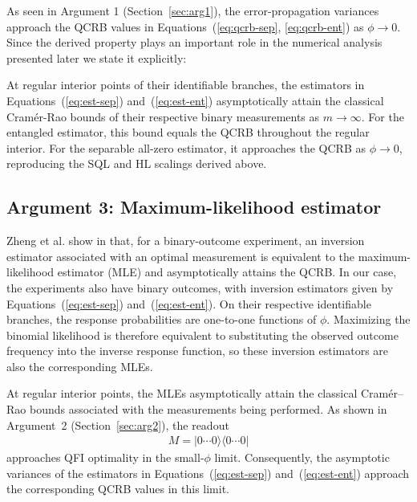 As seen in Argument 1 (Section~\ref{sec:arg1}), the error-propagation variances approach
the QCRB values in Equations~(\ref{eq:qcrb-sep}, \ref{eq:qcrb-ent}) as $\phi\to0$.
Since the derived property plays an important role in the numerical analysis presented 
later we state it explicitly:
\begin{fact}
At regular interior points of their identifiable branches, the estimators in Equations~(\ref{eq:est-sep}) and~(\ref{eq:est-ent}) 
asymptotically attain the classical Cramér-Rao bounds of their respective binary measurements as $m\to\infty$. 
For the entangled estimator, this bound equals the QCRB throughout the regular interior. 
For the separable all-zero estimator, it approaches the QCRB as $\phi\to0$, reproducing the SQL and HL scalings derived above.
\end{fact}

\subsection{Argument 3: Maximum-likelihood estimator}
Zheng et al. show in \cite{zhengQuantumPhaseEstimation2022} that, for a binary-outcome experiment, an inversion estimator associated with an optimal measurement is equivalent to the maximum-likelihood estimator (MLE) and asymptotically attains the QCRB. In our case, the experiments also have binary outcomes, with inversion estimators given by Equations~(\ref{eq:est-sep}) and~(\ref{eq:est-ent}). On their respective identifiable branches, the response probabilities are one-to-one functions of $\phi$. Maximizing the binomial likelihood is therefore equivalent to substituting the observed outcome frequency into the inverse response function, so these inversion estimators are also the corresponding MLEs.

At regular interior points, the MLEs asymptotically attain the classical Cramér--Rao bounds associated with the measurements being performed. As shown in Argument~2 (Section~\ref{sec:arg2}), the readout
\begin{align}
    M = |0\cdots0\rangle\langle0\cdots0|
\end{align}
approaches QFI optimality in the small-$\phi$ limit. Consequently, the asymptotic variances of the estimators in Equations~(\ref{eq:est-sep}) and~(\ref{eq:est-ent}) approach the corresponding QCRB values in this limit.

